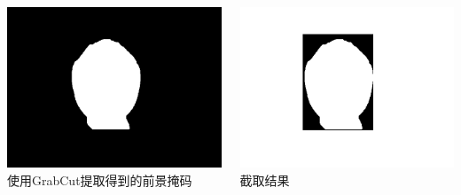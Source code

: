 \documentclass[xcolor=svgnames,serif,table,10pt]{beamer}
\begin{document}
\begin{frame}
  \medskip
  
  \begin{columns}
    \raggedleft
    \begin{minipage}{0.7\linewidth}
      \centering
      \includegraphics[width=\textwidth]{grabcut-mask.png}\\
      使用GrabCut提取得到的前景掩码
    \end{minipage}
    \begin{minipage}{0.7\linewidth}
      \centering
      \includegraphics[width=\textwidth]{grabcut-roi.png}\\
      截取结果
    \end{minipage}
  \end{columns}
\end{frame}
\end{document}
